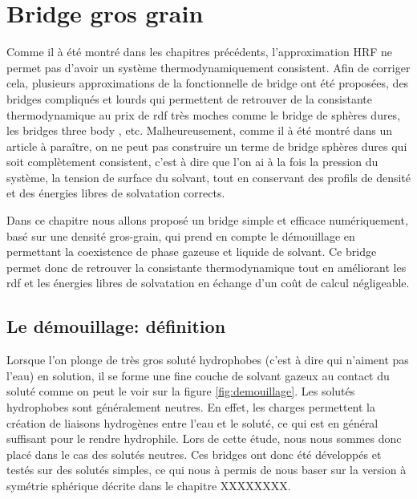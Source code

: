 \chapter{Bridge gros grain}




Comme il à été montré dans les chapitres précédents, l'approximation HRF ne permet pas d'avoir un système thermodynamiquement consistent. Afin de corriger cela, plusieurs approximations de la fonctionnelle de bridge ont été proposées, des bridges compliqués et lourds qui permettent de retrouver de la consistante thermodynamique\cite{jeanmairet_molecular_2015} au prix de rdf très moches comme le bridge de sphères dures\cite{liu_bridge-functional-based_2014,levesque_scalar_2012}, les bridges three body \cite{jeanmairet_molecular_2015}, etc.  Malheureusement, comme il à été montré dans un article à paraître, on ne peut pas construire un terme de bridge sphères dures qui soit complètement consistent, c'est à dire que l'on ai à la fois la pression du système, la tension de surface du solvant, tout en conservant des profils de densité et des énergies libres de solvatation corrects. 

Dans ce chapitre nous allons proposé un bridge simple et efficace numériquement, basé sur une densité gros-grain, qui prend en compte le démouillage en permettant la coexistence de phase gazeuse et liquide de solvant. Ce bridge permet donc de retrouver la consistante thermodynamique tout en améliorant les rdf et les énergies libres de solvatation en échange d'un coût de calcul négligeable.


\section{Le démouillage: définition}
Lorsque l'on plonge de très gros soluté hydrophobes (c'est à dire qui n'aiment pas l'eau) en solution, il se forme une fine couche de solvant gazeux au contact du soluté comme on peut le voir sur la figure \ref{fig:demouillage}. Les solutés hydrophobes sont généralement neutres. En effet, les charges permettent la création de liaisons hydrogènes entre l'eau et le soluté, ce qui est en général suffisant pour le rendre hydrophile. Lors de cette étude, nous nous sommes donc placé dans le cas des solutés neutres. Ces bridges ont donc été développés et testés sur des solutés simples, ce qui nous à permis de nous baser sur la version à symétrie sphérique décrite dans le chapitre XXXXXXXX.

